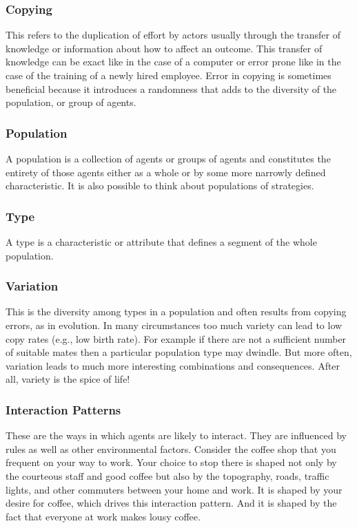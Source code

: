 \documentclass[jou,apacite]{apa6}
\begin{document}
\subsubsection{Copying}
This refers to the duplication of effort by actors usually through the transfer of knowledge or information about how to affect an outcome.   This transfer of knowledge can be exact like in the case of a computer or error prone like in the case of the training of a newly hired employee.  Error in copying is sometimes beneficial because it introduces a randomness that adds to the diversity of the population, or group of agents.

\subsubsection{Population}
A population is a collection of agents or groups of agents and constitutes the entirety of those agents either as a whole or by some more narrowly defined characteristic.  It is also possible to think about populations of strategies.

\subsubsection{Type}
A type is a characteristic or attribute that defines a segment of the whole population.

\subsubsection{Variation}
This is the diversity among types in a population and often results from copying errors, as in evolution.  In many circumstances too much variety can lead to low copy rates (e.g., low birth rate).  For example if there are not a sufficient number of suitable mates then a particular population type may dwindle.  But more often, variation leads to much more interesting combinations and consequences.  After all, variety is the spice of life!

\subsubsection{Interaction Patterns}
These are the ways in which agents are likely to interact.  They are influenced by rules as well as other environmental factors.  Consider the coffee shop that you frequent on your way to work.  Your choice to stop there is shaped not only by the courteous staff and good coffee but also by the topography, roads, traffic lights, and other commuters between your home and work.  It is shaped by your desire for coffee, which drives this interaction pattern. And it is shaped by the fact that
everyone at work makes lousy coffee.
\end{document}
